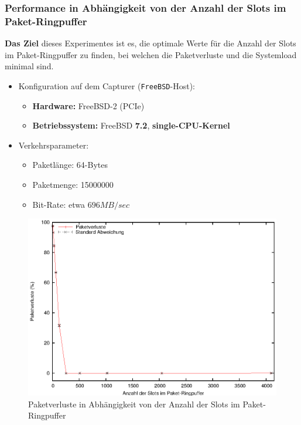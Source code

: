 \subsubsection*{Performance in Abhängigkeit von der Anzahl der Slots im  Paket-Ringpuffer}
\textbf{Das Ziel} dieses Experimentes ist es, die optimale Werte für die 
Anzahl der Slots im Paket-Ringpuffer zu finden, 
bei welchen die Paketverluste und die Systemload minimal sind.
%
\begin{itemize}
\item Konfiguration auf dem Capturer (\verb+FreeBSD+-Host): 
\begin{itemize}
	\item \textbf{Hardware:} FreeBSD-2 (PCIe)
	\item \textbf{Betriebssystem:} FreeBSD \textbf{7.2}, \textbf{single-CPU-Kernel}
\end{itemize}
\item Verkehrsparameter:
\begin{itemize}
	\item Paketlänge: 64-Bytes
	\item Paketmenge: 15000000
	\item Bit-Rate: etwa $696MB/sec$
\end{itemize}
\end{itemize}
\begin{figure} 
\centering \includegraphics[width=5.5in]{plots/graphs/pktlos_single_bufsize.eps}
\caption{Paketverluste in Abhängigkeit von der Anzahl der Slots im Paket-Ringpuffer}
\label{img:plot_pktlos_puffs}
\end{figure}
%
% 
